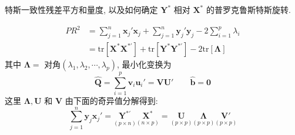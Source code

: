 
特斯一致性残差平方和量度, 以及如何确定 $\mathbf{Y}^{*}$ 相对 $\mathbf{X}^{*}$ 的普罗克鲁斯特斯旋转.

\label{eq:12-50}
\begin{equation}
\begin{aligned}
PR^{2}&=\sum_{j=1}^{n}\mathbf{x}_{j}'\mathbf{x}_{j}+\sum_{j=1}^{n}\mathbf{y}_{j}'\mathbf{y}_{j}-2\sum_{i=1}^{p}\lambda_{i}\\
&=\mathrm{tr}[\mathbf{X}^{*}\mathbf{X}^{*\prime}]+\mathrm{tr}[\mathbf{Y}^{*}\mathbf{Y}^{*\prime}]-2\mathrm{tr}[\boldsymbol{\Lambda}]
\end{aligned}
\tag{12-50}
\end{equation}
其中 $\boldsymbol{\Lambda}=$ 对角$(\lambda_{1},\lambda_{2},\cdots,\lambda_{p})$, 最小化变换为
\label{eq:12-51}
\begin{equation}
\hat{\mathbf{Q}}=\sum_{i=1}^{p}\mathbf{v}_{i}\mathbf{u}_{i}'=\mathbf{V}\mathbf{U}'\qquad \hat{\mathbf{b}}=\mathbf{0} \tag{12-51}
\end{equation}
这里 $\boldsymbol{\Lambda},\mathbf{U}$ 和 $\mathbf{V}$ 由下面的奇异值分解得到:
\[
\sum_{j=1}^{n}\mathbf{y}_{j}\mathbf{x}_{j}'=\underset{(p\times n)}{\mathbf{Y}^{*\prime}}\underset{(n\times p)}{\mathbf{X}^{*}}=\underset{(p\times p)}{\mathbf{U}}\underset{(p\times p)}{\boldsymbol{\Lambda}}\underset{(p\times p)}{\mathbf{V}'}
\]

